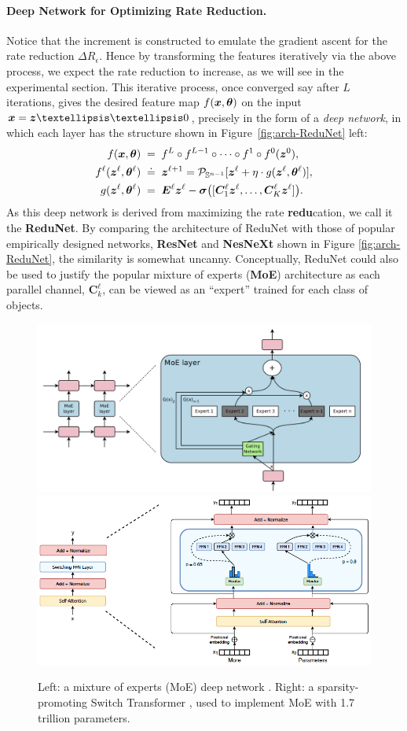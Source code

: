 \documentclass[../../book-main.tex]{subfiles}
\begin{document}
\paragraph{Deep Network for Optimizing Rate Reduction.} Notice that the increment is constructed to emulate the gradient ascent for the rate reduction $\Delta R_\epsilon$. Hence by transforming the features iteratively via the above process, we expect the rate reduction to increase, as we will see in the experimental section. This iterative process, once converged say after $L$ iterations, gives the desired feature map $f(\bm{x}, \bm \theta)$ on the input $\x = \z……0 $, precisely in the form of a {\em deep network}, in which each layer has the structure shown in Figure~\ref{fig:arch-ReduNet} left:
\begin{equation}\label{eqn:ReduNet}
\begin{aligned}
f(\bm{x}, \bm \theta)\; =&  \;\;f^L \circ f^{L-1} \circ  \cdots \circ f^1 \circ
    f^0(\bm{z}^0),  \\ 
f^\ell(\bm{z}^\ell, \bm \theta^\ell) \; \doteq & \;\; \bm{z}^{\ell+1} = \mathcal{P}_{\mathbb{S}^{n-1}}[\bm{z}^{\ell} + \eta\cdot g(\bm{z}^{\ell}, \bm \theta^{\ell})], \\
g(\bm{z}^{\ell}, \bm \theta^{\ell}) \; =&\;\; \bm E^{\ell} \bm{z}^{\ell} -  \bm \sigma\big([\bm{C}^{\ell}_{1} \bm{z}^{\ell}, \dots, \bm{C}^{\ell}_{K} \bm{z}^{\ell}]\big).
\end{aligned}
\end{equation}
As this deep network is derived from maximizing the rate \textbf{redu}cation, we call it the \textbf{ReduNet}. By comparing the architecture of ReduNet with those of popular empirically designed networks, \textbf{ResNet} and \textbf{NesNeXt} shown in Figure \ref{fig:arch-ReduNet}, the similarity is somewhat uncanny. Conceptually, ReduNet could also be used to justify the popular mixture of experts (\textbf{MoE}) architecture \cite{MoE} as each parallel channel, $\bm{C}^{\ell}_k$, can be viewed as an ``expert'' trained for each class of objects.

\begin{figure}[t]
    \centering
    \includegraphics[width=0.45\linewidth]{figs_chap4/MoE.png} \hspace{5mm}
    \includegraphics[width=0.45\linewidth]{figs_chap4/switched-transformer.png}
    \caption{Left: a mixture of experts (MoE) deep network \cite{MoE}. Right: a sparsity-promoting Switch Transformer \cite{Fedus-2022}, used to implement MoE with 1.7 trillion parameters.}
    \label{fig:enter-label}
\end{figure}
\end{document}
